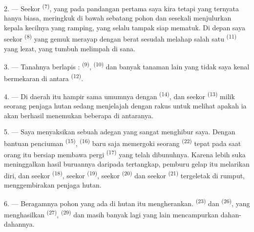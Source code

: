 2. --- Seekor  \textsuperscript{(7)}, yang pada pandangan
pertama saya kira  tetapi yang ternyata hanya
 biasa, meringkuk di bawah sebatang pohon
dan sesekali menjulurkan kepala kecilnya yang ramping, yang selalu
tampak siap mematuk. Di depan saya seekor  \textsuperscript{(8)} yang gemuk merayap dengan berat sesudah
melahap salah satu  \textsuperscript{(11)} yang
lezat, yang tumbuh melimpah di sana.

3. --- Tanahnya berlapis  :
 \textsuperscript{(9)}, 
\textsuperscript{(10)} dan banyak tanaman lain yang tidak saya kenal
bermekaran di antara 
\textsuperscript{(12)}.

4. --- Di daerah itu  hampir sama umumnya dengan
 \textsuperscript{(14)}, dan seekor  \textsuperscript{(13)} milik seorang penjaga hutan sedang
menjelajah dengan rakus untuk melihat apakah ia akan berhasil
menemukan beberapa di antaranya.

\VUsaut{3.0mm}
\VUsaut{3.0mm}

5. --- Saya menyaksikan  sebuah adegan yang sangat
menghibur saya. Dengan bantuan penciuman 
\textsuperscript{(15)}, 
\textsuperscript{(16)} baru saja memergoki seorang  \textsuperscript{(22)} tepat pada saat orang itu bersiap membawa
pergi  \textsuperscript{(17)} yang telah
dibunuhnya. Karena lebih suka meninggalkan hasil buruannya daripada
tertangkap, pemburu gelap itu melarikan diri, dan seekor
 \textsuperscript{(18)}, seekor  \textsuperscript{(19)}, seekor 
\textsuperscript{(20)} dan seekor 
\textsuperscript{(21)} tergeletak di rumput, menggembirakan penjaga
hutan.

6. --- Beragamnya pohon yang ada di hutan itu mengherankan.
 \textsuperscript{(23)} dan  \textsuperscript{(26)},  yang
menghasilkan  \textsuperscript{(27)},  \textsuperscript{(29)} dan masih banyak lagi yang lain
mencampurkan dahan-dahannya.

